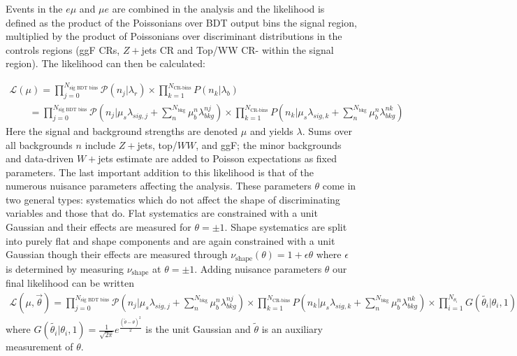 Events in the $e\mu$ and $\mu e$ are combined in the analysis and the likelihood is defined as the product of the Poissonians over BDT output bins the signal region, multiplied by the product of Poissonians over discriminant distributions in the controls regions (ggF CRs, $Z+$jets CR and Top/WW CR- within the signal region). The likelihood can then be calculated: 

\begin{equation}
  \begin{aligned}
\mathcal{L}(\mu) = \displaystyle\prod_{j=0}^{N_{\text{sig BDT bins}}} \mathcal{P} (n_{j}|\lambda_r) \times \displaystyle\prod_{k=1}^{N_{\text{CR-bins}}} P(n_{k}|\lambda_b) \\
\qquad = \displaystyle\prod_{j=0}^{N_{\text{sig BDT bins}}} \mathcal{P} (n_{j}|\mu_s \lambda_{sig,j} + \displaystyle\sum_{n}^{N_{\text{bkg}}}\mu_b^{n} \lambda_{bkg}^{nj}) \times \displaystyle\prod_{k=1}^{N_{\text{CR-bins}}} P(n_{k}|\mu_s \lambda_{sig,k} + \displaystyle\sum_{n}^{N_{\text{bkg}}}\mu_b^{n} \lambda_{bkg}^{nk})
  \end{aligned}
\end{equation}
Here the signal and background strengths are denoted $\mu$ and yields $\lambda$. Sums over all backgrounds $n$ include $Z+$jets, top/$WW$, and ggF; the minor backgrounds and data-driven $W+$jets estimate are added to Poisson expectations as fixed parameters. The last important addition to this likelihood is that of the numerous nuisance parameters affecting the analysis. These parameters $\theta$ come in two general types: systematics which do not affect the shape of discriminating variables and those that do. Flat systematics are constrained with a unit Gaussian and their effects are measured for $\theta=\pm1$. Shape systematics are split into purely flat and shape components and are again constrained with a unit Gaussian though their effects are measured through $\nu_{\text{shape}}(\theta)= 1+\epsilon\theta$ where $\epsilon$ is determined by measuring $\nu_{\text{shape}}$ at $\theta=\pm 1$. Adding nuisance parameters $\theta$ our final likelihood can be written 
\begin{equation}
  \begin{aligned}
\mathcal{L}(\mu,\vec{\theta}) = \displaystyle\prod_{j=0}^{N_{\text{sig BDT bins}}} \mathcal{P} (n_{j}|\mu_s \lambda_{sig,j} + \displaystyle\sum_{n}^{N_{\text{bkg}}}\mu_b^{n} \lambda_{bkg}^{nj}) \times \displaystyle\prod_{k=1}^{N_{\text{CR-bins}}} P(n_{k}|\mu_s \lambda_{sig,k} + \displaystyle\sum_{n}^{N_{\text{bkg}}}\mu_b^{n} \lambda_{bkg}^{nk})  \times
  \displaystyle\prod_{i=1}^{N_{\theta_i}}G(\tilde{\theta_i}|\theta_i,1)
  \end{aligned}
\end{equation}
where $G(\tilde{\theta_i}|\theta_i,1) = \frac{1}{\sqrt{2\pi}}e^{\frac{(\tilde{\theta}-\theta)^2}{2}}$ is the unit Gaussian and $\tilde{\theta}$ is an auxiliary measurement of $\theta$.

